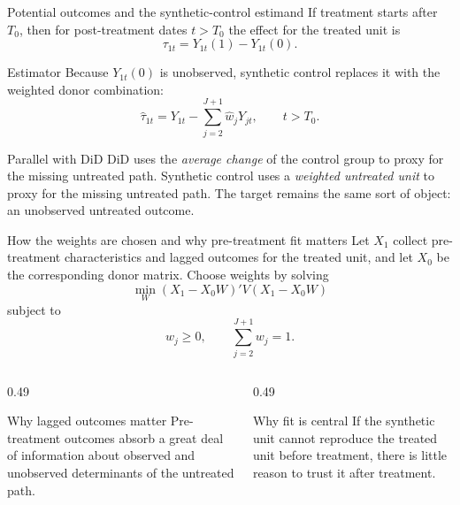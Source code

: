 \documentclass[10pt]{beamer}
\begin{document}
\begin{frame}{Potential outcomes and the synthetic-control estimand}
\label{slide:sc_po}
\small
If treatment starts after $T_0$, then for post-treatment dates $t>T_0$ the effect for the treated unit is
\[
\tau_{1t}=Y_{1t}(1)-Y_{1t}(0).
\]

\begin{block}{Estimator}
Because $Y_{1t}(0)$ is unobserved, synthetic control replaces it with the weighted donor combination:
\[
\hat{\tau}_{1t}
=
Y_{1t}-\sum_{j=2}^{J+1}\hat{w}_j Y_{jt},
\qquad t>T_0.
\]
\end{block}

\begin{alertblock}{Parallel with DiD}
DiD uses the \emph{average change} of the control group to proxy for the missing untreated path. Synthetic control uses a \emph{weighted untreated unit} to proxy for the missing untreated path. The target remains the same sort of object: an unobserved untreated outcome.
\end{alertblock}
\end{frame}

\begin{frame}{How the weights are chosen and why pre-treatment fit matters}
\label{slide:sc_objective}
\small
Let $X_1$ collect pre-treatment characteristics and lagged outcomes for the treated unit, and let $X_0$ be the corresponding donor matrix. Choose weights by solving
\[
\min_W (X_1-X_0W)'V(X_1-X_0W)
\]
subject to
\[
w_j\ge 0,
\qquad
\sum_{j=2}^{J+1} w_j = 1.
\]

\begin{columns}[T]
\begin{column}{0.49\textwidth}
\begin{block}{Why lagged outcomes matter}
Pre-treatment outcomes absorb a great deal of information about observed and unobserved determinants of the untreated path.
\end{block}
\end{column}
\begin{column}{0.49\textwidth}
\begin{alertblock}{Why fit is central}
If the synthetic unit cannot reproduce the treated unit before treatment, there is little reason to trust it after treatment.
\end{alertblock}
\end{column}
\end{columns}

\hfill\hyperlink{app:sc-geom}{}
\end{frame}
\end{document}
